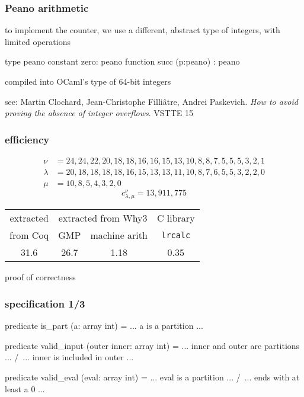 \documentclass{beamer}
\let\emph\alert
\begin{document}
\begin{frame}[fragile]\frametitle{Peano arithmetic}
  to implement the counter, we use a different, abstract type of
  integers, with limited operations
\begin{why3}
  type peano
  constant zero: peano
  function succ (p:peano) : peano
\end{why3}
  compiled into OCaml's type of 64-bit integers

\vfill
  see:
  Martin Clochard, Jean-Christophe Filli\^atre, Andrei Paskevich.
  \textit{How to avoid proving the absence of integer overflows}.
  VSTTE 15
\end{frame}

\begin{frame}\frametitle{efficiency}
  \begin{displaymath}
    \begin{array}{ll}
      \nu & = 24,24,22,20,18,18,16,16,15,13,10,8,8,7,5,5,5,3,2,1 \\
      \lambda & = 20,18,18,18,18,16,15,13,13,11,10,8,7,6,5,5,3,2,2,0 \\
      \mu & = 10,8,5,4,3,2,0
    \end{array}
  \end{displaymath}
  \begin{displaymath}
    c_{\lambda, \mu}^{\nu} = 13,911,775
  \end{displaymath}
  \bigskip
  \begin{center}
    \begin{tabular}{|c|c|c|c|}
      \hline
      extracted & \multicolumn{2}{|c|}{extracted from Why3} & C library \\
      \cline{2-3}
      from Coq  &   GMP  & machine arith & \texttt{lrcalc} \\
      \hline\hline
      31.6      &    26.7   & 1.18 & 0.35 \\
      \hline
    \end{tabular}
  \end{center}
\end{frame}

\begin{frame}
  \begin{center}
    \emph{proof of correctness} \\
    \hrulefill
  \end{center}
\end{frame}

\begin{frame}[fragile]\frametitle{specification 1/3}
\begin{why3}
predicate is_part (a: array int) =
  ... a is a partition ...
\end{why3}
\begin{why3}
predicate valid_input (outer inner: array int) =
  ... inner and outer are partitions ... /\
  ... inner is included in outer ...
\end{why3}
\begin{why3}
predicate valid_eval (eval: array int) =
  ... eval is a partition ... /\
  ... ends with at least a 0 ...
\end{why3}
\end{frame}
\end{document}
